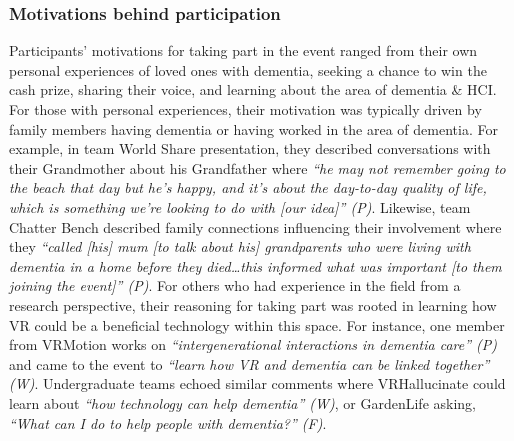 \subsubsection{Motivations behind participation}
\label{ThemeOne:subthemeOne}
Participants’ motivations for taking part in the event ranged from their own personal experiences of loved ones with dementia, seeking a chance to win the cash prize, sharing their voice, and learning about the area of dementia \& HCI. For those with personal experiences, their motivation was typically driven by family members having dementia or having worked in the area of dementia. For example, in team World Share presentation, they described conversations with their Grandmother about his Grandfather where \textit{“he may not remember going to the beach that day but he’s happy, and it’s about the day-to-day quality of life, which is something we’re looking to do with [our idea]” (P)}. Likewise, team Chatter Bench described family connections influencing their involvement where they \textit{“called [his] mum [to talk about his] grandparents who were living with dementia in a home before they died…this informed what was important [to them joining the event]” (P)}. For others who had experience in the field from a research perspective, their reasoning for taking part was rooted in learning how VR could be a beneficial technology within this space. For instance, one member from VRMotion works on \textit{“intergenerational interactions in dementia care” (P)} and came to the event to \textit{“learn how VR and dementia can be linked together” (W)}. Undergraduate teams echoed similar comments where VRHallucinate could learn about \textit{“how technology can help dementia” (W)}, or GardenLife asking, \textit{“What can I do to help people with dementia?” (F)}. 

